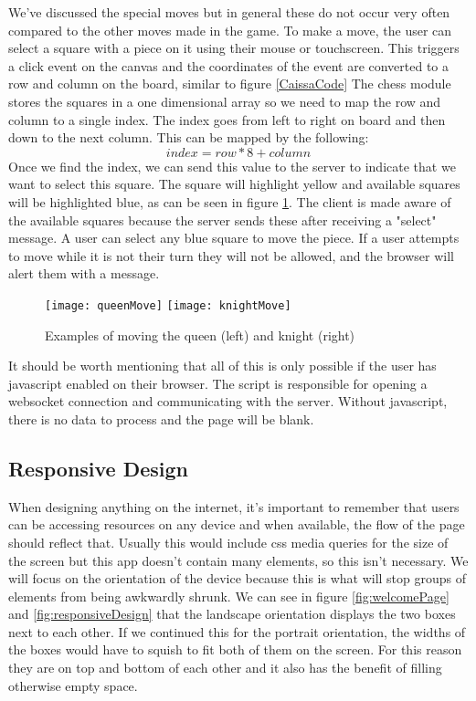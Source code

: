 We've discussed the special moves but in general these do not occur very often compared to the other moves made in the game. To make a move, the user can select a square with a piece on it using their mouse or touchscreen. This triggers a click event on the canvas and the coordinates of the event are converted to a row and column on the board, similar to figure \ref{CaissaCode} The chess module stores the squares in a one dimensional array so we need to map the row and column to a single index. The index goes from left to right on board and then down to the next column. This can be mapped by the following:$$index = row * 8 + column$$Once we find the index, we can send this value to the server to indicate that we want to select this square. The square will highlight yellow and available squares will be highlighted blue, as can be seen in figure \ref{exampleMove}. The client is made aware of the available squares because the server sends these after receiving a "select" message. A user can select any blue square to move the piece. If a user attempts to move while it is not their turn they will not be allowed, and the browser will alert them with a message.

\begin{figure}
    \begin{center}
        \texttt{[image: queenMove]}
        \texttt{[image: knightMove]}
        \caption{Examples of moving the queen (left) and knight (right)}
        \label{exampleMove}
    \end{center}
\end{figure}

It should be worth mentioning that all of this is only possible if the user has javascript enabled on their browser. The script is responsible for opening a websocket connection and communicating with the server. Without javascript, there is no data to process and the page will be blank.

\subsection{Responsive Design}


When designing anything on the internet, it's important to remember that users can be accessing resources on any device and when available, the flow of the page should reflect that. Usually this would include css media queries for the size of the screen but this app doesn't contain many elements, so this isn't necessary. We will focus on the orientation of the device because this is what will stop groups of elements from being awkwardly shrunk. We can see in figure \ref{fig:welcomePage} and \ref{fig:responsiveDesign} that the landscape orientation displays the two boxes next to each other. If we continued this for the portrait orientation, the widths of the boxes would have to squish to fit both of them on the screen. For this reason they are on top and bottom of each other and it also has the benefit of filling otherwise empty space.


